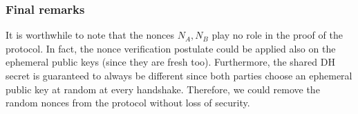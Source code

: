 \subsubsection{Final remarks}
It is worthwhile to note that the nonces $N_A,N_B$ play no role in the proof of
the protocol. 
In fact, the nonce verification postulate could be applied also on the ephemeral 
public keys (since they are fresh too). 
Furthermore, the shared DH secret is guaranteed to always be different since 
both parties choose an ephemeral public key at random at every handshake.
Therefore, we could remove the random nonces from the protocol without loss of 
security. 
